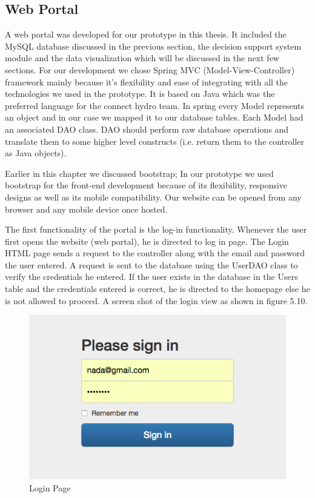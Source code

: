 \subsection{Web Portal}
A web portal was developed for our prototype in this thesis. It included the MySQL database discussed in the previous section, the decision support system module and the data visualization which will be discussed in the next few sections. For our development we chose Spring MVC (Model-View-Controller) framework mainly because it's flexibility and ease of integrating with all the technologies we used in the prototype. It is based on Java which was the preferred language for the connect hydro team. In spring every Model represents an object and in our case we mapped it to our database tables. Each Model had an associated DAO class. DAO should perform raw database operations and translate them to some higher level constructs (i.e. return them to the controller as Java objects). 

Earlier in this chapter we discussed bootstrap; In our prototype we used bootstrap for the front-end development because of its flexibility, responsive designs as well as its mobile compatibility. Our website can be opened from any browser and any mobile device once hosted.

The first functionality of the portal is the log-in functionality. Whenever the user first opens the website (web portal), he is directed to log in page. The Login HTML page sends a request to the controller along with the email and password the user entered. A request is sent to the database using the UserDAO class to verify the credentials he entered. If the user exists in the database in the Users table and the credentials entered is correct, he is directed to the homepage else he is not allowed to proceed. A screen shot of the login view as shown in figure 5.10.
\begin{figure}
\centering
\includegraphics[scale=0.4]{Images/Login.png}
\caption[Login Page]{Login Page}
\end{figure}
